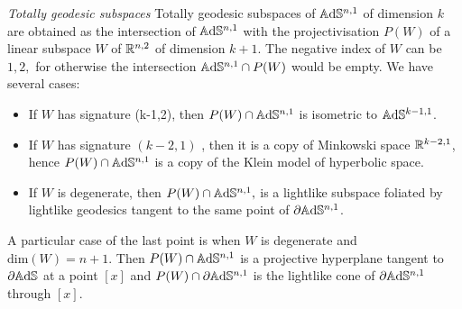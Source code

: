 \noindent\textit{Totally geodesic subspaces} Totally geodesic subspaces of $\mathbb{A}\mathrm{d}\mathbb{S}^{n,1}$ of dimension $k$ are obtained as the intersection of $\mathbb{A}\mathrm{d}\mathbb{S}^{n,1}$ with the projectivisation $P(W)$ of a linear subspace $W$ of $\mathbb{R}^{n,2}$ of dimension $k+1.$ The negative index of $W$ can be $1, 2,$ for otherwise the intersection $\mathbb{A}\mathrm{d}\mathbb{S}^{n,1}\cap P(W)$ would be empty. We have several cases: 
\begin{itemize}
    \item If $W$ has signature (k-1,2), then $P(W)\cap \mathbb{A}\mathrm{d}\mathbb{S}^{n,1}$ is isometric to $\mathbb{A}\mathrm{d}\mathbb{S}^{k-1,1}$. 
    \item If $W$ has signature $(k-2, 1)$ , then it is a copy of Minkowski space $\mathbb{R}^{k-2,1}$, hence $P(W)\cap \mathbb{A}\mathrm{d}\mathbb{S}^{n,1}$ is a copy of the Klein model of hyperbolic space. 
    \item If $W$ is degenerate, then $P(W)\cap \mathbb{A}\mathrm{d}\mathbb{S}^{n,1},$ is a lightlike subspace foliated by lightlike geodesics tangent to the same point of $\partial\mathbb{A}\mathrm{d}\mathbb{S}^{n,1}$. 
\end{itemize}  

A particular case of the last point is when $W$ is degenerate and $\text{dim}(W)=n+1.$ Then $P(W)\cap \mathbb{A}\mathrm{d}\mathbb{S}^{n,1}$ is a projective hyperplane tangent to $\partial\mathbb{A}\mathrm{d}\mathbb{S}$ at a point $[x]$ and $P(W)\cap \partial\mathbb{A}\mathrm{d}\mathbb{S}^{n,1}$ is the lightlike cone of $\partial\mathbb{A}\mathrm{d}\mathbb{S}^{n,1}$ through $[x]$.  

